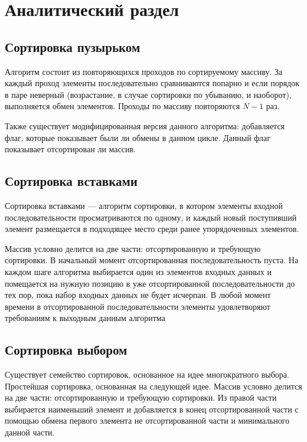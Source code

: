 \chapter{Аналитический раздел}\label{analyth}

\section{Сортировка пузырьком}

Алгоритм состоит из повторяющихся проходов по сортируемому массиву. За каждый проход элементы последовательно сравниваются попарно и если порядок в паре неверный (возрастание, в случае сортировки по убыванию, и наоборот), выполняется обмен элементов. Проходы по массиву повторяются $N−1$ раз. 

Также существует модифицированная версия данного алгоритма: добавляется флаг, которые показывает были ли обмены в данном цикле. Данный флаг показывает отсортирован ли массив.

\section{Сортировка вставками}

Сортировка вставками — алгоритм сортировки, в котором элементы входной последовательности просматриваются по одному, и каждый новый поступивший элемент размещается в подходящее место среди ранее упорядоченных элементов.

Массив условно делится на две части: отсортированную и требующую сортировки. В начальный момент отсортированная последовательность пуста. На каждом шаге алгоритма выбирается один из элементов входных данных и помещается на нужную позицию в уже отсортированной последовательности до тех пор, пока набор входных данных не будет исчерпан. В любой момент времени в отсортированной последовательности элементы удовлетворяют требованиям к выходным данным алгоритма

\section{Сортировка выбором}

Существует семейство сортировок, основанное на идее многократного выбора. Простейшая сортировка, основанная на следующей идее. Массив условно делится на две части: отсортированную и требующую сортировки.
Из правой части выбирается наименьший элемент и добавляется в конец отсортированной части с помощью обмена первого элемента не отсортированной части и минимального данной части.

